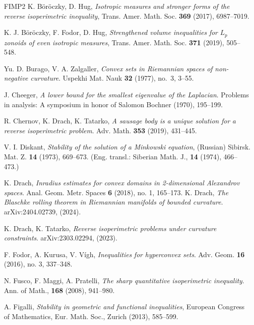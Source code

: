 \documentclass[11pt, oneside]{amsart}
\theoremstyle{theorem}
\theoremstyle{Intro}
\theoremstyle{definition}
\theoremstyle{remark}
\theoremstyle{claim}
\numberwithin{equation}{section}
\begin{document}
\begin{thebibliography}{FIMP2}
 K. B\"or\"oczky, D. Hug, \emph{Isotropic measures and stronger forms of the reverse isoperimetric inequality}, Trans. Amer. Math. Soc. \textbf{369} (2017), 6987--7019.

 K. J. B\"or\"oczky, F. Fodor, D. Hug, \emph{Strengthened volume inequalities for $L_p$ zonoids of even isotropic measures}, Trans. Amer. Math. Soc. \textbf{371} (2019), 505--548.



Yu. D. Burago, V. A. Zalgaller, \emph{Convex sets in Riemannian spaces of non-negative curvature}. Uspekhi Mat. Nauk \textbf{32} (1977), no.~3, 3--55.

%
%
%
%
%

 J. Cheeger, \emph{A lower bound for the smallest eigenvalue of the Laplacian}.
Problems in analysis: A symposium in honor of Salomon Bochner (1970), 195--199.

%
R. Chernov, K. Drach, K. Tatarko, \emph{A sausage body is a unique solution for a reverse isoperimetric problem}. Adv. Math. \textbf{353} (2019), 431--445.
%
%
%
%
%


 V. I. Diskant,  \emph{Stability of the solution of a Minkowski equation}, (Russian) Sibirsk. Mat. Z. {\bf14} (1973), 669--673. (Eng. transl.: Siberian Math. J., {\bf14} (1974), 466--473.)

%
K. Drach, \emph{Inradius estimates for convex domains in 2-dimensional Alexandrov spaces}. Anal. Geom. Metr. Spaces \textbf{6} (2018), no. 1, 165--173. 
%
K. Drach, \emph{The Blaschke rolling theorem in Riemannian manifolds of bounded curvature}. arXiv:2404.02739, (2024).

K. Drach, K. Tatarko, \emph{Reverse isoperimetric problems under curvature constraints}. arXiv:2303.02294, (2023).
%
%

  F. Fodor, A. Kurusa, V. V\'igh, \emph{Inequalities for hyperconvex sets}. Adv. Geom. {\bf16} (2016), no. 3, 337--348.

 N. Fusco, F. Maggi, A. Pratelli, \emph{The sharp quantitative isoperimetric inequality}. Ann. of Math., {\bf168} (2008), 941--980.

 A. Figalli, \emph{Stability in geometric and functional inequalities}, European Congress of Mathematics, Eur. Math. Soc., Zurich (2013), 585--599.



\end{thebibliography}
\end{document}
